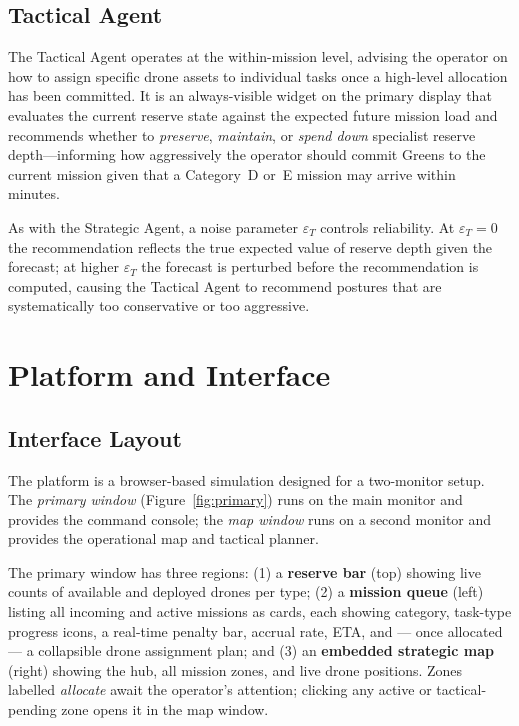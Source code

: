 \documentclass[10pt]{article}
\theoremstyle{definition}
\begin{document}
\subsection{Tactical Agent}\label{sec:tactical}

The Tactical Agent operates at the within-mission level, advising the operator on how to assign specific drone assets to individual tasks once a high-level allocation has been committed. It is an always-visible widget on the primary display that evaluates the current reserve state against the expected future mission load and recommends whether to \emph{preserve}, \emph{maintain}, or \emph{spend down} specialist reserve depth---informing how aggressively the operator should commit Greens to the current mission given that a Category~D or~E mission may arrive within minutes.

As with the Strategic Agent, a noise parameter $\varepsilon_T$ controls reliability. At $\varepsilon_T = 0$ the recommendation reflects the true expected value of reserve depth given the forecast; at higher $\varepsilon_T$ the forecast is perturbed before the recommendation is computed, causing the Tactical Agent to recommend postures that are systematically too conservative or too aggressive.

\section{Platform and Interface}\label{sec:interface}

\subsection{Interface Layout}

The platform is a browser-based simulation designed for a two-monitor setup. The \emph{primary window} (Figure~\ref{fig:primary}) runs on the main monitor and provides the command console; the \emph{map window} runs on a second monitor and provides the operational map and tactical planner.

The primary window has three regions: (1) a \textbf{reserve bar} (top) showing live counts of available and deployed drones per type; (2) a \textbf{mission queue} (left) listing all incoming and active missions as cards, each showing category, task-type progress icons, a real-time penalty bar, accrual rate, ETA, and --- once allocated --- a collapsible drone assignment plan; and (3) an \textbf{embedded strategic map} (right) showing the hub, all mission zones, and live drone positions. Zones labelled \textit{allocate} await the operator's attention; clicking any active or tactical-pending zone opens it in the map window.
\end{document}
